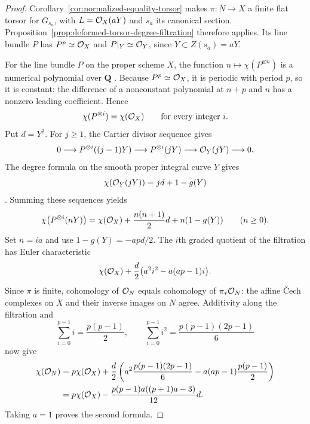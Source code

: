 \begin{proof}
Corollary~\ref{cor:normalized-equality-torsor} makes $\pi:N\to X$
a finite flat torsor for $G_{s_a}$, with
$L=\mathcal O_X(aY)$ and $s_a$ its canonical section.
Proposition~\ref{prop:deformed-torsor-degree-filtration}
therefore applies. Its line bundle $P$ has $P^p\simeq\mathcal O_X$ and
$P|_Y\simeq\mathcal O_Y$, since $Y\subset Z(s_a)=aY$.

For the line bundle $P$ on the proper scheme $X$, the function
$n\mapsto\chi(P^{\otimes n})$ is a numerical polynomial over
$\mathbf Q$ \cite[Lemma~33.45.1, Tag~0BEM]{Stacks}.
Because $P^p\simeq\mathcal O_X$, it is periodic with period $p$, so it is
constant: the difference of a
nonconstant polynomial at $n+p$ and $n$ has a nonzero leading
coefficient. Hence
\[
 \chi(P^{\otimes i})=\chi(\mathcal O_X)
 \qquad\text{for every integer }i.
\]
Put $d=Y^2$. For $j\geq1$, the Cartier divisor sequence gives
\[
 0\longrightarrow P^{\otimes i}((j-1)Y)
 \longrightarrow P^{\otimes i}(jY)
 \longrightarrow\mathcal O_Y(jY)\longrightarrow0.
\]
The degree formula on the smooth proper integral curve $Y$ gives
\[
 \chi(\mathcal O_Y(jY))=jd+1-g(Y)
\]
\cite[Definition~33.44.1 and Lemmas~33.44.5 and~33.44.7,
Tag~0AYQ]{Stacks}.
Summing these sequences yields
\[
 \chi\bigl(P^{\otimes i}(nY)\bigr)
 =\chi(\mathcal O_X)+\frac{n(n+1)}2d+n(1-g(Y))
 \qquad(n\geq0).
\]
Set $n=ia$ and use $1-g(Y)=-apd/2$. The $i$th graded quotient
of the filtration has Euler characteristic
\[
 \chi(\mathcal O_X)+\frac d2\bigl(a^2i^2-a(ap-1)i\bigr).
\]
Since $\pi$ is finite, cohomology of $\mathcal O_N$ equals cohomology of
$\pi_*\mathcal O_N$: the affine \v{C}ech complexes on $X$ and their inverse
images on $N$ agree. Additivity along the filtration and
\[
 \sum_{i=0}^{p-1}i=\frac{p(p-1)}2,\qquad
 \sum_{i=0}^{p-1}i^2=\frac{p(p-1)(2p-1)}6
\]
now give
\[
 \begin{split}
 \chi(\mathcal O_N)
 &=p\chi(\mathcal O_X)
 +\frac d2\left(
 a^2\frac{p(p-1)(2p-1)}6
 -a(ap-1)\frac{p(p-1)}2\right)\\
 &=p\chi(\mathcal O_X)
 -\frac{p(p-1)a((p+1)a-3)}{12}d.
 \end{split}
\]
Taking $a=1$ proves the second formula.
\end{proof}

